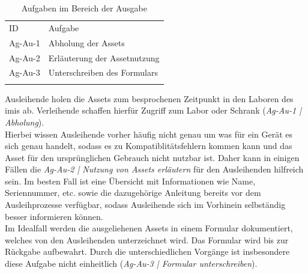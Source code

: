 \begin{table}[h]
        \centering
        \caption{Aufgaben im Bereich der Ausgabe}
        \begin{tabular}{ll}
                \arrayrulecolor{maincolor}\hline
                \sffamily\color{maincolor}ID & \sffamily\color{maincolor}Aufgabe
                \\
                \arrayrulecolor{maincolor}\hline
                Ag-Au-1                      & Abholung der Assets
                \\
                Ag-Au-2                      & Erläuterung der Assetnutzung
                \\
                Ag-Au-3                      & Unterschreiben des Formulars
                \\
                \arrayrulecolor{maincolor}\hline
        \end{tabular}
        \label{table:Ag-Au}
\end{table}

Ausleihende holen die Assets zum besprochenen Zeitpunkt in den Laboren des
\ac{imis} ab. Verleihende schaffen hierfür Zugriff zum Labor oder Schrank
(\textit{Ag-Au-1 | Abholung}). \\
Hierbei wissen Ausleihende vorher häufig nicht genau um was für ein Gerät es
sich genau handelt, sodass es zu Kompatiblitätsfehlern kommen kann und das Asset
für den ursprünglichen Gebrauch nicht nutzbar ist. Daher kann in einigen Fällen
die \textit{Ag-Au-2 | Nutzung von Assets erläutern} für den Ausleihenden
hilfreich sein. Im besten Fall ist eine Übersicht mit Informationen wie Name,
Seriennummer, etc. sowie die dazugehörige Anleitung bereits vor dem
Ausleihprozesse verfügbar, sodass Ausleihende sich im Vorhinein selbständig
besser informieren können.\\
Im Idealfall werden die ausgeliehenen Assets in einem Formular dokumentiert,
welches von den Ausleihenden unterzeichnet wird. Das Formular wird bis zur
Rückgabe aufbewahrt. Durch die unterschiedlichen Vorgänge ist insbesondere diese
Aufgabe nicht einheitlich (\textit{Ag-Au-3 | Formular unterschreiben}).

